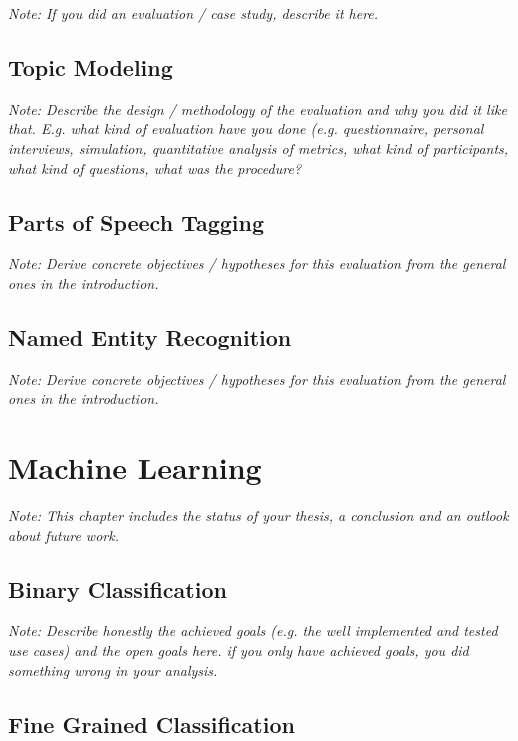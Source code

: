 \documentclass[a4paper,12pt,twoside]{report}
\begin{document}
\textit{Note: If you did an evaluation / case study, describe it here.}

\section{Topic Modeling}

\textit{Note: Describe the design / methodology of the evaluation and why you did it like that. E.g. what kind of evaluation have you done (e.g. questionnaire, personal interviews, simulation, quantitative analysis of metrics, what kind of participants, what kind of questions, what was the procedure?}

\section{Parts of Speech Tagging}

\textit{Note: Derive concrete objectives / hypotheses for this evaluation from the general ones in the introduction.}

\section{Named Entity Recognition}

\textit{Note: Derive concrete objectives / hypotheses for this evaluation from the general ones in the introduction.}


\chapter{Machine Learning}

\textit{Note: This chapter includes the status of your thesis, a conclusion and an outlook about future work.}

\section{Binary Classification}

\textit{Note: Describe honestly the achieved goals (e.g. the well implemented and tested use cases) and the open goals here. if you only have achieved goals, you did something wrong in your analysis.}

\section{Fine Grained Classification}
\end{document}
